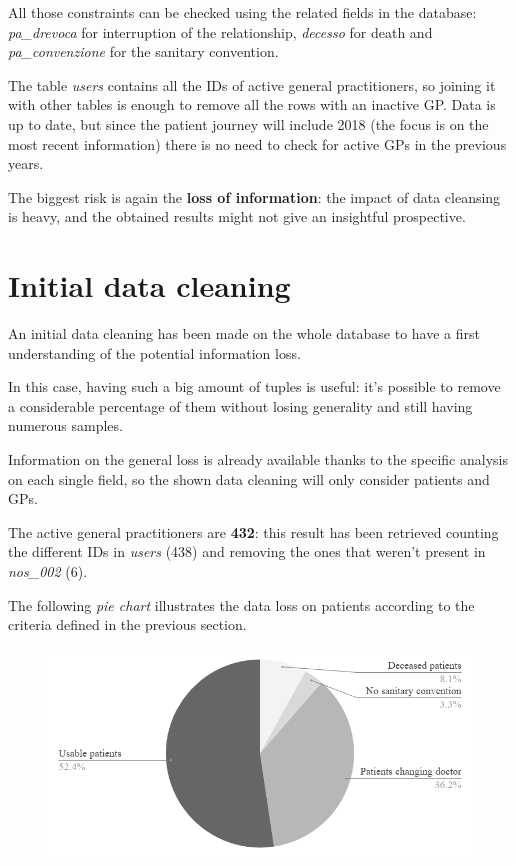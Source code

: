 All those constraints can be checked using the related fields in the database: \textit{pa\_drevoca} for interruption of the relationship, \textit{decesso} for death and \textit{pa\_convenzione} for the sanitary convention.

The table \textit{users} contains all the IDs of active general practitioners, so joining it with other tables is enough to remove all the rows with an inactive GP. Data is up to date, but since the patient journey will include 2018 (the focus is on the most recent information) there is no need to check for active GPs in the previous years.

The biggest risk is again the \textbf{loss of information}: the impact of data cleansing is heavy, and the obtained results might not give an insightful prospective.

\section{Initial data cleaning}
An initial data cleaning has been made on the whole database to have a first understanding of the potential information loss.

In this case, having such a big amount of tuples is useful: it's possible to remove a considerable percentage of them without losing generality and still having numerous samples.

Information on the general loss is already available thanks to the specific analysis on each single field, so the shown data cleaning will only consider patients and GPs.

The active general practitioners are \textbf{432}: this result has been retrieved counting the different IDs in \textit{users} (438) and removing the ones that weren't present in \textit{nos\_002} (6).

The following \textit{pie chart} illustrates the data loss on patients according to the criteria defined in the previous section.
\begin{figure}[h]
	\centering
	\includegraphics[scale=0.6]{images/pie0018.png}
\end{figure}

